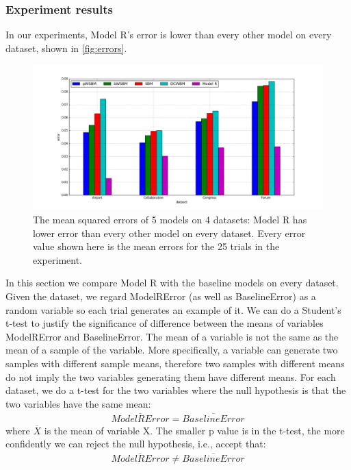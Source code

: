 \documentclass{article}
\begin{document}
\subsubsection{Experiment results}
In our experiments,
Model R's error is lower than every other model on every dataset,
shown in \autoref{fig:errors}.
\begin{figure}[!htb]\centering
	\includegraphics[width=\textwidth]{link-weight-errors}
	\caption{
		The mean squared errors of 5 models on 4 datasets:
		Model R has lower error than every other model on every dataset.
		Every error value shown here is the mean errors for the 25 trials in the experiment.
	}
	\label{fig:errors}
\end{figure}
In this section we compare Model R with the baseline models on every dataset.
Given the dataset,
we regard ModelRError (as well as BaselineError) as a random variable
so each trial generates an example of it.
We can do a Student's t-test to justify the significance of difference between the means of variables ModelRError and BaselineError.
The mean of a variable is not the same as the mean of a sample of the variable.
More specifically, a variable can generate two samples with different sample means,
therefore two samples with different means do not imply the two variables generating them have different means.
For each dataset, we do a t-test for the two variables where the null hypothesis is that the two variables have the same mean:
\begin{align*}
\overline{ModelRError} = \overline{BaselineError}
\end{align*}
where $ \overline{X} $ is the mean of variable X.
The smaller p value is in the t-test, the more confidently we can reject the null hypothesis, i.e., accept that:
\begin{align*}
\overline{ModelRError} \neq \overline{BaselineError}
\end{align*}
\end{document}
